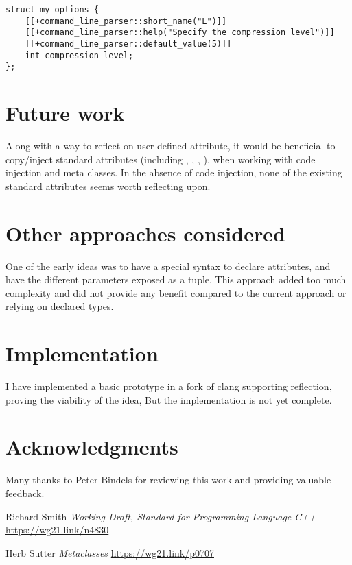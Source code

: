 \documentclass{wg21}
\begin{document}
\begin{verbatim}
struct my_options {
    [[+command_line_parser::short_name("L")]]
    [[+command_line_parser::help("Specify the compression level")]]
    [[+command_line_parser::default_value(5)]]
    int compression_level;
};
\end{verbatim}

\section{Future work}

Along with a way to reflect on user defined attribute, it would be beneficial to copy/inject
standard attributes (including , , , ),
when working with code injection and meta classes.
In the absence of code injection, none of the existing standard attributes seems worth reflecting upon.


\section{Other approaches considered}

One of the early ideas was to have a special syntax to declare attributes, and have the different parameters exposed as a tuple.
This approach added too much complexity and did not provide any benefit compared to the current approach or relying on declared types. 


\section{Implementation}

I have implemented a basic prototype in a fork of clang supporting reflection, proving the viability of the idea,
But the implementation is not yet complete. 


\section{Acknowledgments}

Many thanks to Peter Bindels for
reviewing this work and providing valuable feedback.

\begin{thebibliography}{9}
    
    Richard Smith
    \emph{Working Draft, Standard for Programming Language C++}\newline
    \url{https://wg21.link/n4830}
    
    Herb Sutter
    \emph{Metaclasses}\newline
    \url{https://wg21.link/p0707}
     
\end{thebibliography}
\end{document}
